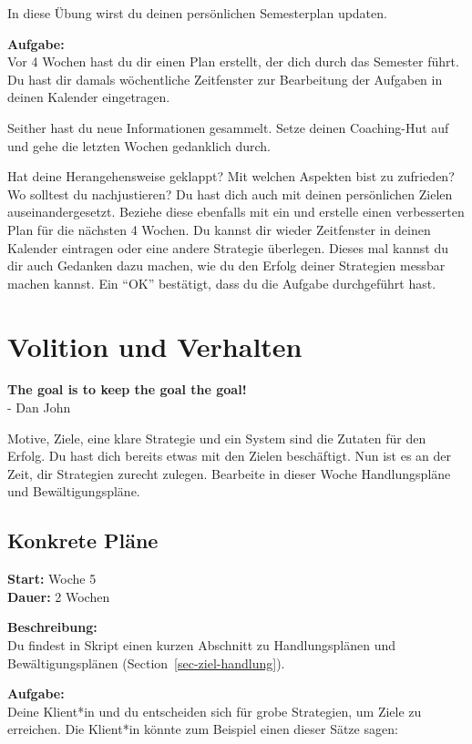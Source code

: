 \documentclass[
  letterpaper,
  DIV=11,
  numbers=noendperiod]{scrreprt}
\begin{document}
In diese Übung wirst du deinen persönlichen Semesterplan updaten.

\textbf{Aufgabe:}\\
Vor 4 Wochen hast du dir einen Plan erstellt, der dich durch das
Semester führt. Du hast dir damals wöchentliche Zeitfenster zur
Bearbeitung der Aufgaben in deinen Kalender eingetragen.

Seither hast du neue Informationen gesammelt. Setze deinen Coaching-Hut
auf und gehe die letzten Wochen gedanklich durch.

Hat deine Herangehensweise geklappt? Mit welchen Aspekten bist zu
zufrieden? Wo solltest du nachjustieren? Du hast dich auch mit deinen
persönlichen Zielen auseinandergesetzt. Beziehe diese ebenfalls mit ein
und erstelle einen verbesserten Plan für die nächsten 4 Wochen. Du
kannst dir wieder Zeitfenster in deinen Kalender eintragen oder eine
andere Strategie überlegen. Dieses mal kannst du dir auch Gedanken dazu
machen, wie du den Erfolg deiner Strategien messbar machen kannst. Ein
``OK'' bestätigt, dass du die Aufgabe durchgeführt hast.

\section{Volition und Verhalten}\label{volition-und-verhalten}

\textbf{The goal is to keep the goal the goal!}\\
- Dan John

Motive, Ziele, eine klare Strategie und ein System sind die Zutaten für
den Erfolg. Du hast dich bereits etwas mit den Zielen beschäftigt. Nun
ist es an der Zeit, dir Strategien zurecht zulegen. Bearbeite in dieser
Woche Handlungspläne und Bewältigungspläne.

\subsection{Konkrete Pläne}\label{konkrete-pluxe4ne}

\textbf{Start:} Woche 5\\
\textbf{Dauer:} 2 Wochen

\textbf{Beschreibung:}\\
Du findest in Skript einen kurzen Abschnitt zu Handlungsplänen und
Bewältigungsplänen (Section~\ref{sec-ziel-handlung}).

\textbf{Aufgabe:}\\
Deine Klient*in und du entscheiden sich für grobe Strategien, um Ziele
zu erreichen. Die Klient*in könnte zum Beispiel einen dieser Sätze
sagen:
\end{document}
